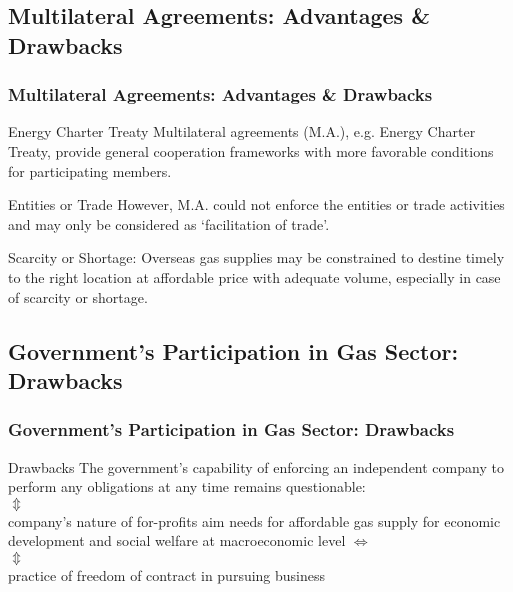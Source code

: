 \documentclass[pdflatex,compress,10pt,
	xcolor={dvipsnames,dvipsnames,svgnames,x11names,table},
	hyperref={
	colorlinks = true,
	breaklinks = true, 
	citecolor=NavyBlue, 
	urlcolor = blue, 
	filecolor=magenta} 
]{beamer}
\begin{document}
\subsection{Multilateral Agreements: Advantages \& Drawbacks}
\begin{frame}\frametitle{Multilateral Agreements: Advantages \& Drawbacks}

\begin{alertblock}{Energy Charter Treaty}
Multilateral agreements (M.A.), e.g. Energy Charter Treaty, provide general cooperation frameworks with more favorable conditions for participating members.
\end{alertblock}

\begin{block}{Entities or Trade}
However, M.A. could not enforce the entities or trade activities and may only be considered as ‘facilitation of trade’.
\end{block}

\begin{examples}{Scarcity or Shortage:}
Overseas gas supplies may be constrained to destine timely to the right location at affordable price with adequate volume, especially in case of scarcity or shortage.
\end{examples}

\end{frame}

\subsection{Government's Participation in Gas Sector: Drawbacks}
\begin{frame}\frametitle{Government's Participation in Gas Sector: Drawbacks}
\begin{alertblock}{Drawbacks}
The government’s capability of enforcing an independent company to perform any obligations at any time remains questionable:\\
$\Updownarrow$\\
company’s nature of for-profits aim needs for affordable gas supply for economic development and social welfare at macroeconomic level $\Leftrightarrow$\\
$\Updownarrow$\\
practice of freedom of contract in pursuing business
\end{alertblock}
\end{frame}
\end{document}
